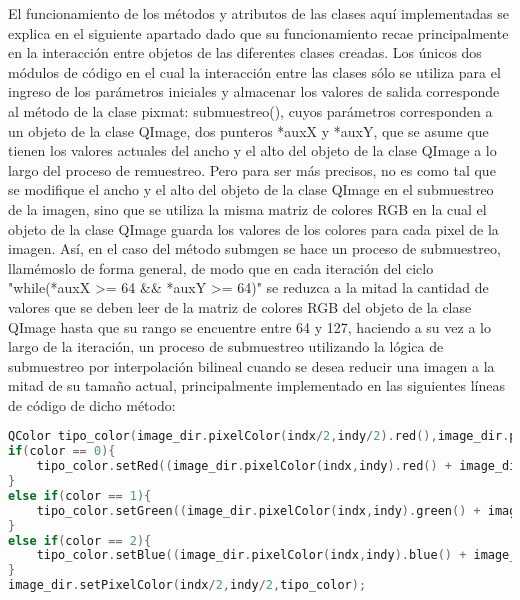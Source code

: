 \documentclass{article}
\begin{document}
El funcionamiento de los métodos y atributos de las clases aquí implementadas se explica en el siguiente apartado dado que su funcionamiento recae principalmente en la interacción entre objetos de las diferentes clases creadas. Los únicos dos módulos de código en el cual la interacción entre las clases sólo se utiliza para el ingreso de los parámetros iniciales y almacenar los valores de salida corresponde al método de la clase pixmat: submuestreo(), cuyos parámetros corresponden a un objeto de la clase QImage, dos punteros *auxX y *auxY, que se asume que tienen los valores actuales del ancho y el alto del objeto de la clase QImage a lo largo del proceso de remuestreo. Pero para ser más precisos, no es como tal que se modifique el ancho y el alto del objeto de la clase QImage en el submuestreo de la imagen, sino que se utiliza la misma matriz de colores RGB en la cual el objeto de la clase QImage guarda los valores de los colores para cada pixel de la imagen. Así, en el caso del método submgen se hace un proceso de submuestreo, llamémoslo de forma general, de modo que en cada iteración del ciclo "while(*auxX >= 64 && *auxY >= 64)" se reduzca a la mitad la cantidad de valores que se deben leer de la matriz de colores RGB del objeto de la clase QImage hasta que su rango se encuentre entre 64 y 127, haciendo a su vez a lo largo de la iteración, un proceso de submuestreo utilizando la lógica de submuestreo por interpolación bilineal cuando se desea reducir una imagen a la mitad de su tamaño actual, principalmente implementado en las siguientes líneas de código de dicho método:
\begin{lstlisting}[language=C++, label=metodopixmat_submgen_interpolacionbilineal]
QColor tipo_color(image_dir.pixelColor(indx/2,indy/2).red(),image_dir.pixelColor(indx/2,indy/2).green(),image_dir.pixelColor(indx/2,indy/2).blue());
if(color == 0){
    tipo_color.setRed((image_dir.pixelColor(indx,indy).red() + image_dir.pixelColor(indx+1,indy).red() + image_dir.pixelColor(indx,indy+1).red() + image_dir.pixelColor(indx+1,indy+1).red())/4);
}
else if(color == 1){
    tipo_color.setGreen((image_dir.pixelColor(indx,indy).green() + image_dir.pixelColor(indx+1,indy).green() + image_dir.pixelColor(indx,indy+1).green() + image_dir.pixelColor(indx+1,indy+1).green())/4);
}
else if(color == 2){
    tipo_color.setBlue((image_dir.pixelColor(indx,indy).blue() + image_dir.pixelColor(indx+1,indy).blue() + image_dir.pixelColor(indx,indy+1).blue() + image_dir.pixelColor(indx+1,indy+1).blue())/4);
}
image_dir.setPixelColor(indx/2,indy/2,tipo_color);
\end{lstlisting}
\end{document}
